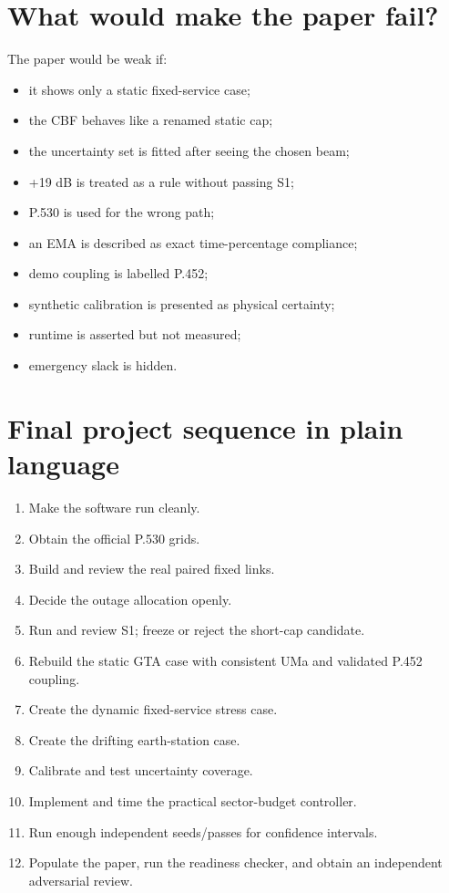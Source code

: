 \documentclass[11pt]{article}
\begin{document}
\section{What would make the paper fail?}

The paper would be weak if:

\begin{itemize}
\item it shows only a static fixed-service case;
\item the CBF behaves like a renamed static cap;
\item the uncertainty set is fitted after seeing the chosen beam;
\item +19 dB is treated as a rule without passing S1;
\item P.530 is used for the wrong path;
\item an EMA is described as exact time-percentage compliance;
\item demo coupling is labelled P.452;
\item synthetic calibration is presented as physical certainty;
\item runtime is asserted but not measured;
\item emergency slack is hidden.
\end{itemize}

\section{Final project sequence in plain language}

\begin{enumerate}
\item Make the software run cleanly.
\item Obtain the official P.530 grids.
\item Build and review the real paired fixed links.
\item Decide the outage allocation openly.
\item Run and review S1; freeze or reject the short-cap candidate.
\item Rebuild the static GTA case with consistent UMa and validated P.452 coupling.
\item Create the dynamic fixed-service stress case.
\item Create the drifting earth-station case.
\item Calibrate and test uncertainty coverage.
\item Implement and time the practical sector-budget controller.
\item Run enough independent seeds/passes for confidence intervals.
\item Populate the paper, run the readiness checker, and obtain an independent adversarial review.
\end{enumerate}
\end{document}
